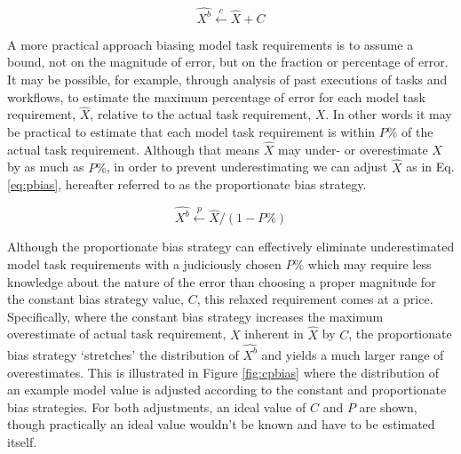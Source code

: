 \documentclass[10pt]{csce}
\begin{document}
\begin{equation}
\hat{X^b} \xleftarrow{c} \hat{X} + C
\label{eq:cbias}
\end{equation}

A more practical approach biasing model task requirements is to assume a bound,
not on the magnitude of error, but on the fraction or percentage of error.  It
may be possible, for example, through analysis of past executions of tasks and
workflows, to estimate the maximum percentage of error for each model task
requirement, $\hat{X}$, relative to the actual task requirement, $X$.  In other
words it may be practical to estimate that each model task requirement is
within $P\%$ of the actual task requirement.  Although that means $\hat{X}$
may under- or overestimate $X$ by as much as $P\%$, in order to prevent
underestimating we can adjust $\hat{X}$ as in Eq. \ref{eq:pbias}, hereafter
referred to as the proportionate bias strategy.

\begin{equation}
\hat{X^b} \xleftarrow{p} \hat{X} / (1 - P\%)
\label{eq:pbias}
\end{equation}

Although the proportionate bias strategy can effectively eliminate
underestimated model task requirements with a judiciously chosen $P\%$
which may require less knowledge about the nature of the error than choosing
a proper magnitude for the constant bias strategy value, $C$, this relaxed
requirement comes at a price.  Specifically, where the constant bias
strategy increases the maximum overestimate of actual task requirement, $X$
inherent in $\hat{X}$ by $C$, the proportionate bias strategy `stretches'
the distribution of $\hat{X^b}$ and yields a much larger range of
overestimates.  This is illustrated in Figure \ref{fig:cpbias} where the
distribution of an example model value is adjusted according to the constant
and proportionate bias strategies.  For both adjustments, an ideal value of
$C$ and $P$ are shown, though practically an ideal value wouldn't be known
and have to be estimated itself.
\end{document}
